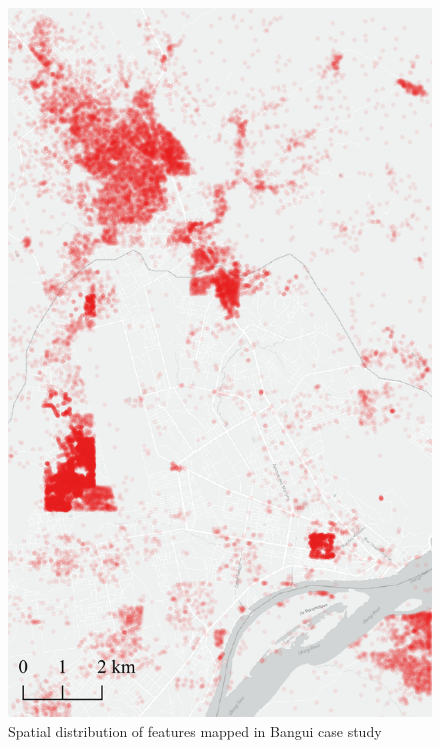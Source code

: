 \begin{figure} %
    \centering %
    \includegraphics[width = \textwidth]{Images/car_2.png} %
    \caption{Spatial distribution of features mapped in Bangui case study} %
\end{figure}

